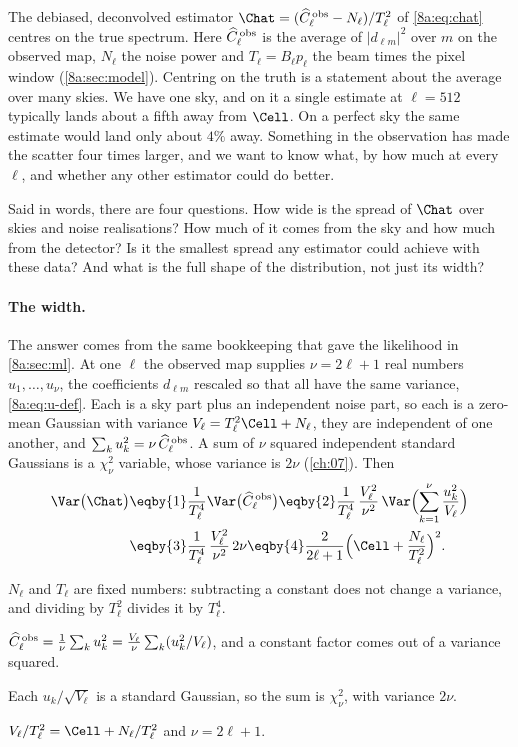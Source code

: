 The debiased, deconvolved estimator $\Chat=(\widehat C^{\,\rm obs}_\ell-N_\ell)/T_\ell^2$ of
\eqref{8a:eq:chat} centres on the true spectrum. Here $\widehat C^{\,\rm obs}_\ell$ is the
average of $|d_{\ell m}|^2$ over $m$ on the observed map, $N_\ell$ the noise power and
$T_\ell=B_\ell p_\ell$ the beam times the pixel window (\cref{8a:sec:model}). Centring on the
truth is a statement about the average over many skies. We have one sky, and on it a single
estimate at $\ell=512$ typically lands about a fifth away from $\Cell$. On a perfect sky the
same estimate would land only about $4\%$ away. Something in the observation has made the
scatter four times larger, and we want to know what, by how much at every $\ell$, and whether
any other estimator could do better.

Said in words, there are four questions. How wide is the spread of $\Chat$ over skies and
noise realisations? How much of it comes from the sky and how much from the detector? Is it
the smallest spread any estimator could achieve with these data? And what is the full shape
of the distribution, not just its width?

\paragraph{The width.}
The answer comes from the same bookkeeping that gave the likelihood in \cref{8a:sec:ml}. At
one $\ell$ the observed map supplies $\nu=2\ell+1$ real numbers $u_1,\dots,u_\nu$, the
coefficients $d_{\ell m}$ rescaled so that all have the same variance, \eqref{8a:eq:u-def}. Each is
a sky part plus an independent noise part, so each is a zero-mean Gaussian with variance
$V_\ell=T_\ell^2\Cell+N_\ell$, they are independent of one another, and
$\sum_ku_k^2=\nu\,\widehat C^{\,\rm obs}_\ell$. A sum of $\nu$ squared
independent standard Gaussians is a $\chi^2_\nu$ variable, whose variance is $2\nu$
(\cref{ch:07}). Then
\begin{align}
  \Var\bigl(\Chat\bigr)
  &\eqby{1}\frac{1}{T_\ell^4}\Var\bigl(\widehat C^{\,\rm obs}_\ell\bigr)
   \eqby{2}\frac{1}{T_\ell^4}\,\frac{V_\ell^2}{\nu^2}\,\Var\Bigl(\sum_{k=1}^{\nu}\frac{u_k^2}{V_\ell}\Bigr)
   \nonumber\\
  &\eqby{3}\frac{1}{T_\ell^4}\,\frac{V_\ell^2}{\nu^2}\,2\nu
   \eqby{4}\frac{2}{2\ell+1}\Bigl(\Cell+\frac{N_\ell}{T_\ell^2}\Bigr)^2 .
  \label{8a:eq:var}
\end{align}
\begin{explain}
  \item $N_\ell$ and $T_\ell$ are fixed numbers: subtracting a constant does not change a
        variance, and dividing by $T_\ell^2$ divides it by $T_\ell^4$.
  \item $\widehat C^{\,\rm obs}_\ell=\frac1\nu\sum_ku_k^2=\frac{V_\ell}{\nu}\sum_k(u_k^2/V_\ell)$,
        and a constant factor comes out of a variance squared.
  \item Each $u_k/\sqrt{V_\ell}$ is a standard Gaussian, so the sum is $\chi^2_\nu$, with variance $2\nu$.
  \item $V_\ell/T_\ell^2=\Cell+N_\ell/T_\ell^2$ and $\nu=2\ell+1$.
\end{explain}

